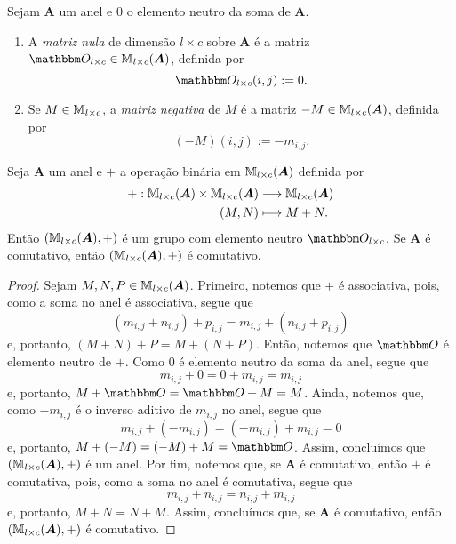 \begin{defi}
	Sejam $\bm A$ um anel e $0$ o elemento neutro da soma de $\bm A$.
	\begin{enumerate}
	\item A \emph{matriz nula} de dimensão $l \times c$ sobre $\bm A$ é a matriz $\zero_{l \times c} \in \M_{l \times c}(\bm A)$, definida por
		\begin{equation*}
		\zero_{l \times c}(i,j) := 0.
		\end{equation*}
	\item Se $M \in \mathbb{M}_{l \times c}$, a \emph{matriz negativa} de $M$ é a matriz $-M \in \mathbb{M}_{l \times c}(\bm A)$, definida por
		\begin{equation*}
		(-M)(i,j) := -m_{i,j}.
		\end{equation*}
	\end{enumerate}
\end{defi}

\begin{prop}
	Seja $\bm A$ um anel e $+$ a operação binária em $\mathbb{M}_{l \times c}(\bm A)$ definida por
	\begin{align*}
	{+}: {\mathbb{M}_{l \times c}(\bm A) \times \mathbb{M}_{l \times c}(\bm A)} &\longrightarrow {\mathbb{M}_{l \times c}(\bm A)} \\{(M,N)} &\longmapsto {M+N.}
	\end{align*}
Então $(\mathbb{M}_{l \times c}(\bm A),+)$ é um grupo com elemento neutro $\zero_{l \times c}$. Se $\bm A$ é comutativo, então $(\mathbb{M}_{l \times c}(\bm A),+)$ é comutativo.
\end{prop}
\begin{proof}
	Sejam $M,N,P \in \mathbb{M}_{l \times c}(\bm A)$. Primeiro, notemos que $+$ é associativa, pois, como a soma no anel é associativa, segue que
	\begin{equation*}
	(m_{i,j}+n_{i,j})+p_{i,j} = m_{i,j}+(n_{i,j}+p_{i,j})
	\end{equation*}
e, portanto, $(M+N)+P=M+(N+P)$. Então, notemos que $\zero$ é elemento neutro de $+$. Como $0$ é elemento neutro da soma da anel, segue que
	\begin{equation*}
	m_{i,j}+0 = 0+m_{i,j} = m_{i,j}
	\end{equation*}
e, portanto, $M+\zero=\zero+M=M$. Ainda, notemos que, como $-m_{i,j}$ é o inverso aditivo de $m_{i,j}$ no anel, segue que
	\begin{equation*}
	m_{i,j}+(-m_{i,j}) = (-m_{i,j})+m_{i,j} = 0
	\end{equation*}
e, portanto, $M+(-M)=(-M)+M=\zero$.	Assim, concluímos que $(\mathbb{M}_{l \times c}(\bm A),+)$ é um anel. Por fim, notemos que, se $\bm A$ é comutativo, então $+$ é comutativa, pois, como a soma no anel é comutativa, segue que
	\begin{equation*}
	m_{i,j}+n_{i,j} = n_{i,j}+m_{i,j}
	\end{equation*}
e, portanto, $M+N=N+M$. Assim, concluímos que, se $\bm A$ é comutativo, então $(\mathbb{M}_{l \times c}(\bm A),+)$ é comutativo.
\end{proof}


